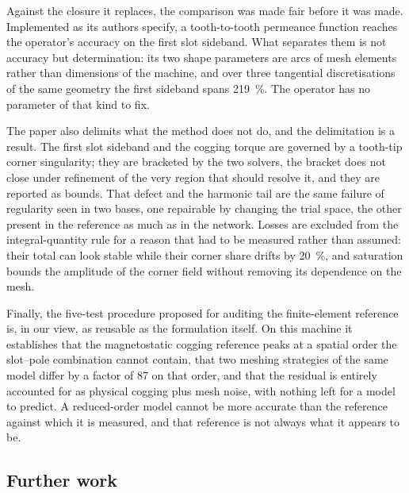 \documentclass[10pt,a4paper,twocolumn]{article}
\theoremstyle{plain}
\theoremstyle{remark}
\begin{document}
Against the closure it replaces, the comparison was made fair before it
was made. Implemented as its authors specify, a tooth-to-tooth permeance
function reaches the operator's accuracy on the first slot sideband.
What separates them is not accuracy but determination: its two shape
parameters are arcs of mesh elements rather than dimensions of the
machine, and over three tangential discretisations of the same geometry
the first sideband spans \SI{219}{\percent}. The operator has no
parameter of that kind to fix.

The paper also delimits what the method does not do, and the
delimitation is a result. The first slot sideband and the cogging torque
are governed by a tooth-tip corner singularity; they are bracketed by
the two solvers, the bracket does not close under refinement of the very
region that should resolve it, and they are reported as bounds. That
defect and the harmonic tail are the same failure of regularity seen in
two bases, one repairable by changing the trial space, the other
present in the reference as much as in the network. Losses are excluded
from the integral-quantity rule for a reason that had to be measured
rather than assumed: their total can look stable while their corner
share drifts by \SI{20}{\percent}, and saturation bounds the amplitude
of the corner field without removing its dependence on the mesh.

Finally, the five-test procedure proposed for auditing the
finite-element reference is, in our view, as reusable as the formulation
itself. On this machine it establishes that the magnetostatic cogging
reference peaks at a spatial order the slot--pole combination cannot
contain, that two meshing strategies of the same model differ by a
factor of \num{87} on that order, and that the residual is entirely
accounted for as physical cogging plus mesh noise, with nothing left for
a model to predict. A reduced-order model cannot be more accurate than
the reference against which it is measured, and that reference is not
always what it appears to be.

\subsection*{Further work}
\label{sub:further}
\end{document}
